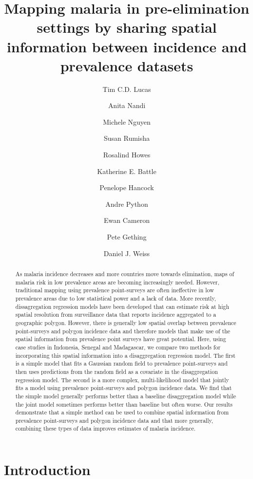 \documentclass{statsoc}
\title[Mapping malaria by sharing spatial information]{Mapping malaria in pre-elimination settings by sharing spatial information between incidence and prevalence datasets}
\author[Tim C.D. Lucas {\it et al.}]{Tim C.D. Lucas}
\author{Anita Nandi}
\author{Michele Nguyen}
\author{Susan Rumisha}
\author{Rosalind Howes}
\author{Katherine E. Battle}
\author{Penelope Hancock}
\author{Andre Python}
\author{Ewan Cameron}
\author{Pete Gething}
\author{Daniel J. Weiss}
\begin{document}
\begin{abstract}
As malaria incidence decreases and more countries move towards elimination, maps of malaria risk in low prevalence areas are becoming increasingly needed.
However, traditional mapping using prevalence point-surveys are often ineffective in low prevalence areas due to low statistical power and a lack of data.
More recently, dissagregation regression models have been developed that can estimate risk at high spatial resolution from surveillance data that reports incidence aggregated to a geographic polygon.
However, there is generally low spatial overlap between prevalence point-surveys and polygon incidence data and therefore models that make use of the spatial information from prevalence point surveys have great potential.
Here, using case studies in Indonesia, Senegal and Madagascar, we compare two methods for incorporating this spatial information into a disaggregation regression model.
The first is a simple model that fits a Gaussian random field to prevalence point-surveys and then uses predictions from the random field as a covariate in the disaggregation regression model.
The second is a more complex, multi-likelihood model that jointly fits a model using prevalence point-surveys and  polygon incidence data.
We find that the simple model generally performs better than a baseline disaggregation model while the joint model sometimes performs better than baseline but often worse.
Our results demonstrate that a simple method can be used to combine spatial information from prevalence point-surveys and polygon incidence data and that more generally, combining these types of data improves estimates of malaria incidence.
\end{abstract}



\section*{Introduction}


\end{document}
